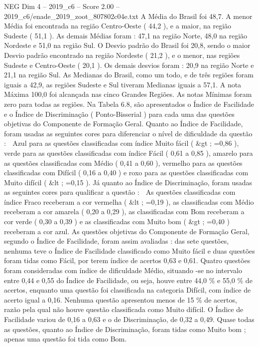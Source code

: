 \begin{textsample}{NEG Dim 4 – 2019\_c6 – Score 2.00 – 2019\_c6/enade\_2019\_zoot\_807802c04e.txt}
A Média do Brasil foi 48,7.
A menor Média foi encontrada na região Centro-Oeste ( 44,2 ), e a maior, na região Sudeste ( 51,1 ).
As demais Médias foram : 47,1 na região Norte, 48,0 na região Nordeste e 51,0 na região Sul.
O Desvio padrão do Brasil foi 20,8, sendo o maior Desvio padrão encontrado na região Nordeste ( 21,2 ), e o menor, nas regiões Sudeste e Centro-Oeste ( 20,1 ).
Os demais desvios foram : 20,9 na região Norte e 21,1 na região Sul.
As Medianas do Brasil, como um todo, e de três regiões foram iguais a 42,9, as regiões Sudeste e Sul tiveram Medianas iguais a 57,1.
A nota Máxima 100,0 foi alcançada nas cinco Grandes Regiões.
As notas Mínimas foram zero para todas as regiões.
Na Tabela 6.8, são apresentados o Índice de Facilidade e o Índice de Discriminação ( Ponto-Bisserial ) para cada uma das questões objetivas do Componente de Formação Geral.
Quanto ao Índice de Facilidade, foram usadas as seguintes cores para diferenciar o nível de dificuldade da questão :  Azul para as questões classificadas com índice Muito fácil ( \&gt ; =0,86 ), verde para as questões classificadas com índice Fácil ( 0,61 a 0,85 ), amarelo para as questões classificadas com Médio ( 0,41 a 0,60 ), vermelho para as questões classificadas com Difícil ( 0,16 a 0,40 ) e roxo para as questões classificadas com Muito difícil ( \&lt ; =0,15 ).
Já quanto ao Índice de Discriminação, foram usadas as seguintes cores para qualificar a questão :  As questões classificadas com índice Fraco receberam a cor vermelha ( \&lt ; =0,19 ), as classificadas com Médio receberam a cor amarela ( 0,20 a 0,29 ), as classificadas com Bom receberam a cor verde ( 0,30 a 0,39 ) e as classificadas com Muito bom ( \&gt ; =0,40 ) receberam a cor azul.
As questões objetivas do Componente de Formação Geral, segundo o Índice de Facilidade, foram assim avaliadas : das sete questões, nenhuma teve o Índice de Facilidade classificado como Muito fácil e duas questões foram tidas como Fácil, por terem índice de acertos 0,63 e 0,61.
Quatro questões foram consideradas com índice de dificuldade Médio, situando -se no intervalo entre 0,44 e 0,55 do Índice de Facilidade, ou seja, houve entre 44,0 \% e 55,0 \% de acertos, enquanto uma questão foi classificada na categoria Difícil, com índice de acerto igual a 0,16.
Nenhuma questão apresentou menos de 15 \% de acertos, razão pela qual não houve questão classificada como Muito difícil.
O Índice de Facilidade variou de 0,16 a 0,63 e o de Discriminação, de 0,32 a 0,49.
Quase todas as questões, quanto ao Índice de Discriminação, foram tidas como Muito bom ; apenas uma questão foi tida como Bom.

\end{textsample}
